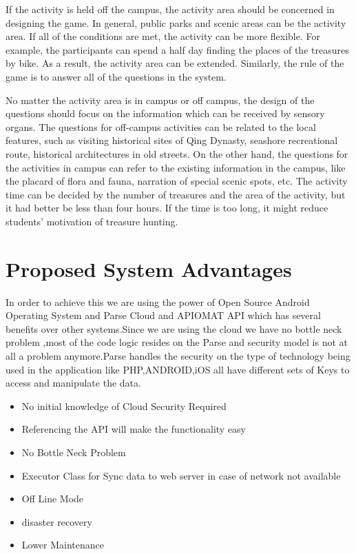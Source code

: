 \documentclass[12pt,a4paper,times]{report}
\begin{document}
	If the activity is held off the campus, the activity area should be concerned in designing the game. In general, public parks and scenic areas can be the activity area. If all of the conditions are met, the activity can be more flexible. For example, the participants can spend a half day finding the places of the treasures by bike. As a result, the activity area can be extended. Similarly, the rule of the game is to answer all of the questions in the system.
	
	No matter the activity area is in campus or off campus, the design of the questions should focus on the information which can be received by sensory organs. The questions for off-campus activities can be related to the local features, such as visiting historical sites of Qing Dynasty, seashore recreational route, historical architectures in old streets. On the other hand, the questions for the activities in campus can refer to the existing information in the campus, like the placard of flora and fauna, narration of special scenic spots, etc. The activity time can be decided by the number of treasures and the area of the activity, but it had better be less than four hours. If the time is too long, it might reduce students’ motivation of treasure hunting.
	
	
	
	
	
	
	\section{Proposed  System Advantages}
	In order to achieve this we are using the power of Open Source Android Operating System and Parse Cloud and APIOMAT API which has several benefits over other systems.Since we are using the cloud we have no bottle neck problem ,most of the code logic resides on the Parse
	and security model is not at all a problem anymore.Parse handles the security on the type of technology being used in the application like PHP,ANDROID,iOS all have different sets of Keys to access and manipulate the data.
	
	
	
	\begin{itemize}
	
	
	
	 \item No initial knowledge of Cloud Security Required
	\item Referencing the API will make the functionality easy
	\item  No Bottle Neck Problem 
	\item Executor Class for Sync data to web server in case of network not available
	\item Off Line Mode
	\item  disaster recovery
	\item Lower Maintenance  
	
	
	
	\end{itemize}
	
\end{document}
